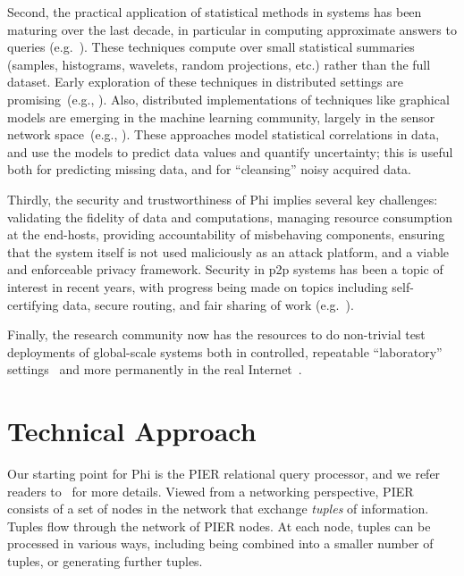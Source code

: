 \documentclass[twocolumn,10pt]{article}
\def\Lrp{Phi\xspace}
\begin{document}
Second, the practical application of statistical methods in systems
has been maturing over the last decade, in particular in computing
approximate answers to queries (e.g.~\cite{newjersey}). %
These techniques compute over small statistical summaries (samples,
histograms, wavelets, random projections, etc.) rather than the full
dataset.  Early exploration of these techniques in distributed
settings are promising~(e.g., \cite{gibbons04}).
Also, distributed implementations of techniques like graphical
models are emerging in the machine learning community, largely in the
sensor network space~(e.g., \cite{paskinguestrin}). 
These approaches model statistical
correlations in data, and use the models to predict data values and
quantify uncertainty; this is useful
both for predicting missing data, and for ``cleansing'' noisy acquired data.

Thirdly, the security and trustworthiness of \Lrp implies several
key challenges: validating the fidelity of data and computations,
managing resource consumption at the end-hosts, providing
accountability of misbehaving components, ensuring that the system
itself is not used maliciously as an attack platform, and a viable and
enforceable privacy framework.    Security in p2p
systems has been a topic of interest in recent years, with progress
being made on topics including self-certifying data, secure routing,
and fair sharing of work (e.g.~\cite{wallach02}).

Finally, the research community now has the resources to do non-trivial
test deployments of global-scale systems both in controlled,
repeatable ``laboratory'' settings~\cite{White+:osdi02,
  Vahdat+:osdi02} and more permanently in the real
Internet~\cite{planetlab:hotnets}.

\section{Technical Approach}

Our starting point for \Lrp is the PIER relational query processor,
and we refer readers to~\cite{huebsch_vldb03} for more details.
Viewed from a networking perspective, PIER consists of a set of nodes
in the network that exchange \emph{tuples} of information.  Tuples
flow through the network of PIER nodes.  At each node, tuples can be
processed in various ways, including being combined into a smaller
number of tuples, or generating further tuples. 
\end{document}

